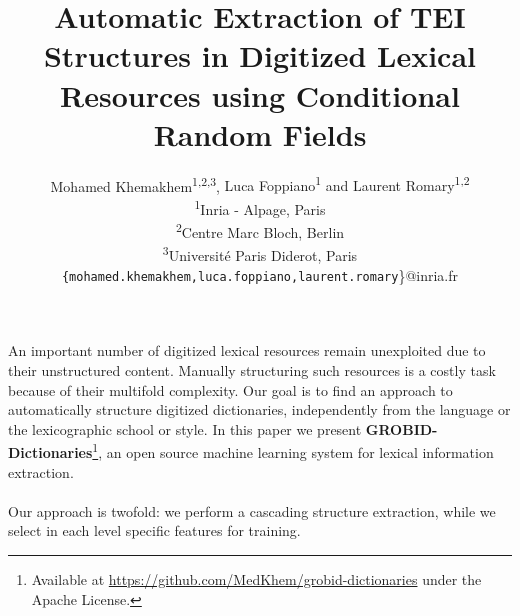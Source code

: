 \documentclass[twocolumn,a4paper]{article}
\newcommand*{\affaddr}[1]{#1} %
\newcommand*{\affmark}[1][*]{\textsuperscript{#1}}
\newcommand*{\email}[1]{\texttt{#1}}
\begin{document}
\title{Automatic Extraction of TEI Structures in Digitized Lexical Resources using Conditional Random Fields}  
\author{%
Mohamed Khemakhem\affmark[1,2,3], {Luca Foppiano\affmark[1] and Laurent Romary\affmark[1,2]\\
\affaddr{\affmark[1]Inria - Alpage, Paris}\\
\affaddr{\affmark[2]Centre Marc Bloch, Berlin}\\
\affaddr{\affmark[3]Université Paris Diderot, Paris}\\
\email{\{mohamed.khemakhem,luca.foppiano,laurent.romary}\}@inria.fr}\\
}
\maketitle


\paragraph{}An important number of digitized lexical resources remain unexploited due to their unstructured content.
Manually structuring such resources is a costly task because of their multifold complexity. 
Our goal is to find an approach to automatically structure digitized dictionaries, independently from the language or the lexicographic school or style. In this paper we present \textbf{GROBID-Dictionaries}\footnote{Available at \url{https://github.com/MedKhem/grobid-dictionaries} under the Apache License.}, an open source machine learning system for lexical information extraction.
 
\paragraph{} Our approach is twofold: we perform a cascading structure extraction, while we select in each level specific features for training.
\end{document}
